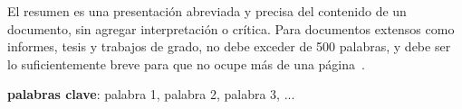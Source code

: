 
El resumen es una presentación abreviada y precisa del contenido de un documento, sin agregar interpretación o crítica. Para documentos extensos como informes, tesis y trabajos de grado, no debe exceder de 500 palabras, y debe ser lo suficientemente breve para que no ocupe más de una página~\cite{NTC14862008}.

\textbf{palabras clave}: palabra 1, palabra 2, palabra 3, ...